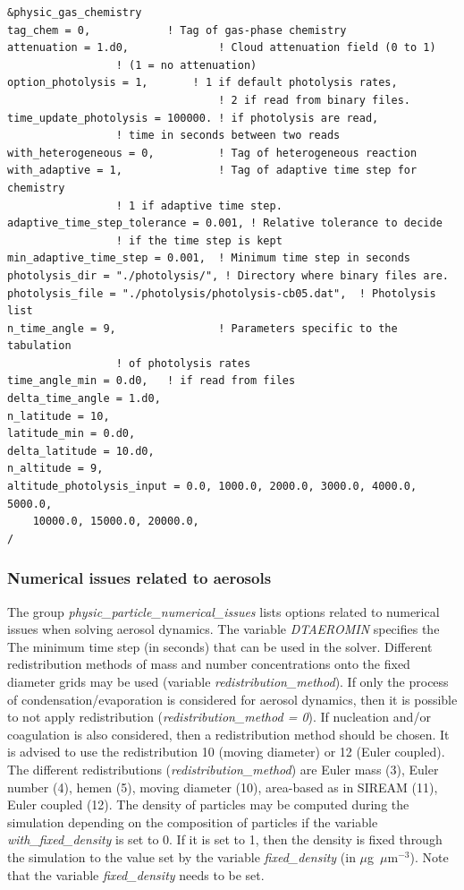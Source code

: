 \documentclass[a4paper,11pt]{article}
\begin{document}
\begin{verbatim}
&physic_gas_chemistry
tag_chem = 0,		   	 ! Tag of gas-phase chemistry
attenuation = 1.d0,              ! Cloud attenuation field (0 to 1)
				 ! (1 = no attenuation)
option_photolysis = 1,	 	 ! 1 if default photolysis rates, 
                                 ! 2 if read from binary files.
time_update_photolysis = 100000. ! if photolysis are read, 
				 ! time in seconds between two reads
with_heterogeneous = 0,          ! Tag of heterogeneous reaction 
with_adaptive = 1,               ! Tag of adaptive time step for chemistry 
				 ! 1 if adaptive time step.
adaptive_time_step_tolerance = 0.001, ! Relative tolerance to decide 
			 	 ! if the time step is kept
min_adaptive_time_step = 0.001,  ! Minimum time step in seconds
photolysis_dir = "./photolysis/", ! Directory where binary files are.
photolysis_file = "./photolysis/photolysis-cb05.dat",  ! Photolysis list
n_time_angle = 9,                ! Parameters specific to the tabulation 
			 	 ! of photolysis rates
time_angle_min = 0.d0,   ! if read from files
delta_time_angle = 1.d0,
n_latitude = 10,
latitude_min = 0.d0,
delta_latitude = 10.d0,
n_altitude = 9,
altitude_photolysis_input = 0.0, 1000.0, 2000.0, 3000.0, 4000.0, 5000.0, 
	10000.0, 15000.0, 20000.0, 
/
\end{verbatim}


\subsubsection{Numerical issues related to aerosols}

The group {\textit{physic\_particle\_numerical\_issues}} lists options related to numerical issues when solving aerosol dynamics. 
The variable {\textit{DTAEROMIN}} specifies the The minimum time step (in seconds) that can be used in the solver. 
Different redistribution methods of mass and number concentrations onto the fixed diameter grids may be used (variable {\textit{redistribution\_method}}). If only the process of condensation/evaporation is considered for aerosol dynamics, then it is possible to not apply redistribution ({\textit{redistribution\_method = 0}}). If nucleation and/or coagulation is also considered, then a redistribution method should be chosen. It is advised to use the redistribution 10 (moving diameter) or 12 (Euler coupled). The different redistributions ({\textit{redistribution\_method}}) are Euler mass (3), Euler number (4), hemen (5), moving diameter (10), area-based as in SIREAM (11), Euler coupled (12).
The density of particles may be computed during the simulation depending on the composition of particles if the variable {\textit{with\_fixed\_density}} is set to 0. If it is set to 1, then the density is fixed through the simulation to the value set by the variable {\textit{fixed\_density}} (in $\mu$g~$\mu$m$^{-3}$). Note that the variable {\textit{fixed\_density}} needs to be set.
\end{document}
